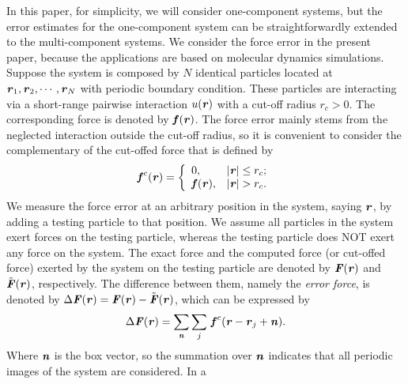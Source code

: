 \documentclass[aps,pre,preprint]{revtex4}
\renewcommand{\v}[1]{\textbf{\textit{#1}}}
\begin{document}
In this paper, for simplicity,
we will consider one-component systems, but
the error estimates for
the one-component system can be straightforwardly extended to the
multi-component systems.  We consider
the force error in the present paper, because the
applications are based on molecular dynamics simulations.
Suppose the system is composed by $N$ identical particles located at
$\v r_1, \v r_2, \cdots, \v r_N$ with periodic boundary condition.
These particles are interacting via a short-range pairwise interaction
$u(\v r)$ with a cut-off radius $r_c > 0$. The corresponding force is
denoted by $\v f(\v r)$. 
The force error mainly stems from the neglected interaction outside
the cut-off radius, so it is convenient to consider the complementary
of the cut-offed force that is defined by
\begin{align}
  \v f^c(\v r) =
  \left\{
  \begin{array}{ll}
    0, & \vert\v r\vert\leq r_c; \\
    \v f(\v r), & \vert\v r\vert > r_c.
  \end{array}
  \right.
\end{align}
We measure the force error at an arbitrary position in the system,
saying $\v r$, by adding a testing particle to that position.  We
assume all particles in the system exert forces on the testing
particle, whereas the testing particle does NOT exert any force on the
system.  The exact force and the computed force (or cut-offed force)
exerted by the system on the testing particle are denoted by ${\v
  F}(\v r)$ and $\tilde{\v F}(\v r)$, respectively.  The difference
between them, namely the \emph{error force}, is denoted by $\Delta\v
F(\v r) = \v F(\v r) - \tilde{\v F}(\v r)$, which can be expressed by
\begin{align}
  \Delta\v F(\v r) = \sum_{\v n}\sum_{j}\, \v f^c(\v r - \v r_j + \v n).
\end{align}
Where $\v n$ is the box vector, so the summation over $\v n$ indicates
that all periodic images of the system are considered. In a
\end{document}
